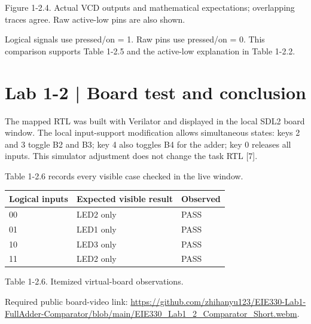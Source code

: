 \documentclass[10pt,a4paper]{article}
\begin{document}
{\small\raggedright Figure 1-2.4. Actual VCD outputs and mathematical expectations; overlapping traces agree. Raw active-low pins are also shown.\par}

{\small\raggedright Logical signals use pressed/on = 1. Raw pins use pressed/on = 0. This comparison supports Table 1-2.5 and the active-low explanation in Table 1-2.2.\par}

\clearpage

\section*{Lab 1-2 | Board test and conclusion}

{\small\raggedright The mapped RTL was built with Verilator and displayed in the local SDL2 board window. The local input-support modification allows simultaneous states: keys 2 and 3 toggle B2 and B3; key 4 also toggles B4 for the adder; key 0 releases all inputs. This simulator adjustment does not change the task RTL [7].\par}

{\small\raggedright Table 1-2.6 records every visible case checked in the live window.\par}

\begingroup\small\setlength{\tabcolsep}{4pt}
\renewcommand{\arraystretch}{1.20}
\noindent\begin{tabular}{@{}p{}p{}p{}@{}}
\toprule
\textbf{Logical inputs} & \textbf{Expected visible result} & \textbf{Observed} \\
\midrule
00 & LED2 only & PASS \\
01 & LED1 only & PASS \\
10 & LED3 only & PASS \\
11 & LED2 only & PASS \\
\bottomrule
\end{tabular}\par\endgroup
\vspace{2mm}

{\small\raggedright Table 1-2.6. Itemized virtual-board observations.\par}

{\small\raggedright Required public board-video link: \url{https://github.com/zhihanyu123/EIE330-Lab1-FullAdder-Comparator/blob/main/EIE330_Lab1_2_Comparator_Short.webm}.\par}
\end{document}
